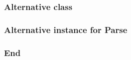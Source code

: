 \documentclass{beamer}
\begin{document}
\begin{frame}
  \frametitle{Alternative class}


\end{frame}


\begin{frame}
  \frametitle{Alternative instance for Parse}





\end{frame}



\begin{frame}
  \frametitle{End}
\end{frame}
\end{document}
